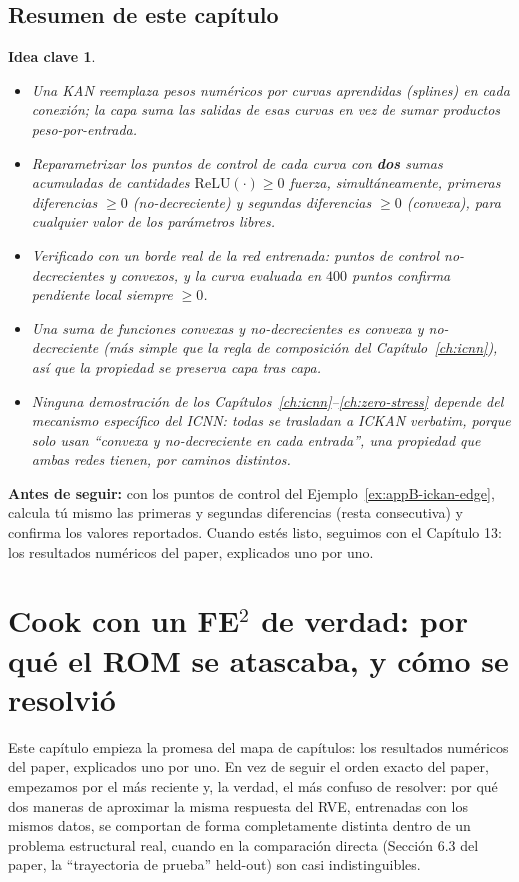 \documentclass[11pt,a4paper]{article}
\newtheorem{takeaway}{Idea clave}
\begin{document}
\subsection{Resumen de este cap\'itulo}

\begin{takeaway}
\begin{itemize}
\item Una KAN reemplaza pesos num\'ericos por curvas aprendidas
(splines) en cada conexi\'on; la capa suma las salidas de esas curvas
en vez de sumar productos peso-por-entrada.
\item Reparametrizar los puntos de control de cada curva con
\textbf{dos} sumas acumuladas de cantidades $\mathrm{ReLU}(\cdot)\geq0$
fuerza, simult\'aneamente, primeras diferencias $\geq0$
(no-decreciente) y segundas diferencias $\geq0$ (convexa), para
cualquier valor de los par\'ametros libres.
\item Verificado con un borde real de la red entrenada: puntos de
control no-decrecientes y convexos, y la curva evaluada en $400$
puntos confirma pendiente local siempre $\geq0$.
\item Una suma de funciones convexas y no-decrecientes es convexa y
no-decreciente (m\'as simple que la regla de composici\'on del
Cap\'itulo~\ref{ch:icnn}), as\'i que la propiedad se preserva capa tras
capa.
\item Ninguna demostraci\'on de los Cap\'itulos~\ref{ch:icnn}--\ref{ch:zero-stress}
depende del mecanismo espec\'ifico del ICNN: todas se trasladan a
ICKAN verbatim, porque solo usan ``convexa y no-decreciente en cada
entrada'', una propiedad que ambas redes tienen, por caminos distintos.
\end{itemize}
\end{takeaway}

\bigskip
\noindent\textbf{Antes de seguir:} con los puntos de control del
Ejemplo~\ref{ex:appB-ickan-edge}, calcula t\'u mismo las primeras y
segundas diferencias (resta consecutiva) y confirma los valores
reportados. Cuando est\'es listo, seguimos con el Cap\'itulo 13: los
resultados num\'ericos del paper, explicados uno por uno.

\section{Cook con un FE$^2$ de verdad: por qu\'e el ROM se atascaba, y c\'omo se resolvi\'o}
\label{ch:cook-fe2}

Este cap\'itulo empieza la promesa del mapa de cap\'itulos: los
resultados num\'ericos del paper, explicados uno por uno. En vez de
seguir el orden exacto del paper, empezamos por el m\'as reciente y, la
verdad, el m\'as confuso de resolver: por qu\'e dos maneras de aproximar
la misma respuesta del RVE, entrenadas con los mismos datos, se
comportan de forma completamente distinta dentro de un problema
estructural real, cuando en la comparaci\'on directa (Secci\'on 6.3 del
paper, la ``trayectoria de prueba'' held-out) son casi indistinguibles.
\end{document}
